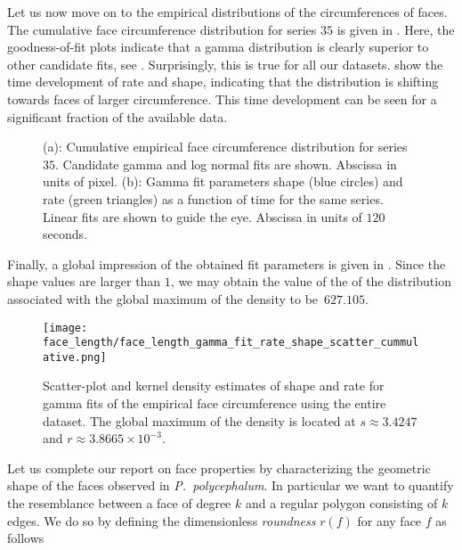 		Let us now move on to the empirical distributions of the circumferences of faces. The cumulative face circumference distribution for series $35$ is given in . Here, the goodness-of-fit plots indicate  that a gamma distribution is clearly superior to other candidate fits, see . Surprisingly, this is true for all our datasets.  show the time development of rate and shape, indicating that the distribution is shifting towards faces of larger circumference. This time development can be seen for a significant fraction of the available data.

		\begin{figure}
			\centering

			\caption[Face circumference distribution.]{(a): Cumulative empirical face circumference distribution for series $35$. Candidate gamma and log normal fits are shown. Abscissa in units of pixel. (b): Gamma fit parameters shape (blue circles) and rate (green triangles) as a function of time for the same series. Linear fits are shown to guide the eye. Abscissa in units of $120$ seconds.}
			\label{fig:face_length_fit}
		\end{figure}

		Finally, a global impression of the obtained fit parameters is given in . Since the shape values are larger than $1$, we may obtain the value of the of the distribution associated with the global maximum of the density to be~$627.105$.

		\begin{figure}[!htbp]
			\centering
				\texttt{[image: face\_length/face\_length\_gamma\_fit\_rate\_shape\_scatter\_cummulative.png]}
			\caption[Face circumference fit parameter densities.]{Scatter-plot and kernel density estimates of shape and rate for gamma fits of the empirical face circumference using the entire dataset. The global maximum of the density is located at $s \approx 3.4247$ and $r \approx 3.8665 \times 10^{-3}$.}
			\label{fig:face_length_kde}
		\end{figure}

		Let us complete our report on face properties by characterizing the geometric shape of the faces observed in \emph{P.~polycephalum}. In particular we want to quantify the resemblance between a face of degree $k$ and a regular polygon consisting of $k$ edges. We do so by defining the dimensionless \emph{roundness} $r(f)$ for any face $f$ as follows

